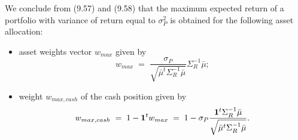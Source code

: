 We conclude from (9.57) and (9.58) that the maximum expected return of a portfolio
with variance of return equal to $\sigma_P^2$ is obtained for the following asset
allocation:
\begin{itemize}
\item asset weights vector $w_{max}$ given by
\begin{equation}
w_{max} \;=\;
\frac{\sigma_P}{\sqrt{\bar\mu^t\Sigma_R^{-1}\bar\mu}}\Sigma_R^{-1}\bar\mu;
\end{equation}
\item weight $w_{max,cash}$ of the cash position given by
\begin{equation}
w_{max,cash} \;=\; 1-\mathbf{1}^tw_{max} \;=\;
1-\sigma_P\frac{\mathbf{1}^t\Sigma_R^{-1}\bar\mu}{\sqrt{\bar\mu^t\Sigma_R^{-1}\bar\mu}}.
\end{equation}
\end{itemize}
